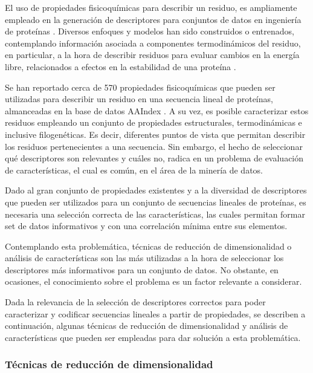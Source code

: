 El uso de propiedades fisicoquímicas para describir un residuo, es ampliamente empleado en la generación de descriptores para conjuntos de datos en ingeniería de proteínas \cite{capriotti2005mutant2, capriotti2008three}. Diversos enfoques y modelos han sido construidos o entrenados, contemplando información asociada a componentes termodinámicos del residuo, en particular, a la hora de describir residuos para evaluar cambios en la energía libre, relacionados a efectos en la estabilidad de una proteína \cite{ancien2018prediction, broom2017computational, 1gzp030}.

Se han reportado cerca de 570 propiedades fisicoquímicas que pueden ser utilizadas para describir un residuo en una secuencia lineal de proteínas, almanceadas en la base de datos AAIndex \cite{Kawashima2000}. A su vez, es posible caracterizar estos residuos empleando un conjunto de propiedades estructurales, termodinámicas e inclusive filogenéticas. Es decir, diferentes puntos de vista que permitan describir los residuos pertenecientes a una secuencia. Sin embargo, el hecho de seleccionar qué descriptores son relevantes y cuáles no, radica en un problema de evaluación de características, el cual es común, en el área de la minería de datos. 

Dado al gran conjunto de propiedades existentes y a la diversidad de descriptores que pueden ser utilizados para un conjunto de secuencias lineales de proteínas, es necesaria una selección correcta de las características, las cuales permitan formar set de datos informativos y con una correlación mínima entre sus elementos. 

Contemplando esta problemática, técnicas de reducción de dimensionalidad o análisis de características son las más utilizadas a la hora de seleccionar los descriptores más informativos para un conjunto de datos. No obstante, en ocasiones, el conocimiento sobre el problema es un factor relevante a considerar. 

Dada la relevancia de la selección de descriptores correctos para poder caracterizar y codificar secuencias lineales a partir de propiedades, se describen a continuación, algunas técnicas de reducción de dimensionalidad y análisis de características que pueden ser empleadas para dar solución a esta problemática.

\subsubsection{Técnicas de reducción de dimensionalidad}

